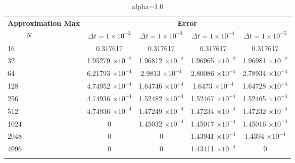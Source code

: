 	\begin{table}
		\begin{tabular}{lcccc}
			\toprule
			\multicolumn{1}{c}{\textbf{Approximation Max}} & \multicolumn{4}{c}{\textbf{Error}} \\
			$\hspace{9mm}N$ & $\Delta t=1\times 10^{-2}$ & $\Delta t=1\times 10^{-3}$ & $\Delta t=1\times 10^{-4}$ & $\Delta t=1\times 10^{-5}$ \\
			\midrule
			\hspace{7mm} 16 & 0.317617    & 0.317617    & 0.317617    & 0.317617    \\
			\midrule
			\hspace{7mm} 32 & 1.95279 $\times 10 ^{-2}$  & 1.96812 $\times 10 ^{-2}$   & 1.96965 $\times 10 ^{-2}$   & 1.96981 $\times 10 ^{-2}$   \\
			\midrule
			\hspace{7mm} 64 & 6.21793 $\times 10 ^{-4}$ & 2.9813 $\times 10 ^{-4}$  & 2.80086 $\times 10 ^{-4}$ & 2.78934 $\times 10 ^{-4}$ \\
			\midrule
			\hspace{7mm} 128 & 4.74952 $\times 10 ^{-4}$ & 1.64746 $\times 10 ^{-4}$ & 1.6473 $\times 10 ^{-4}$  & 1.64728 $\times 10 ^{-4}$ \\
			\midrule
			\hspace{7mm} 256 & 4.74936 $\times 10 ^{-4}$ & 1.52482 $\times 10 ^{-4}$ & 1.52467 $\times 10 ^{-4}$ & 1.52465 $\times 10 ^{-4}$ \\
			\midrule
			\hspace{7mm} 512 & 4.74936 $\times 10 ^{-4}$ & 1.47249 $\times 10 ^{-4}$ & 1.47234 $\times 10 ^{-4}$ & 1.47232 $\times 10 ^{-4}$ \\
			\midrule
			\hspace{7mm} 1024 & 0           & 1.45032 $\times 10 ^{-4}$ & 1.45017 $\times 10 ^{-4}$ & 1.45016 $\times 10 ^{-4}$ \\
			\midrule
			\hspace{7mm} 2048 & 0           & 0           & 1.43941 $\times 10 ^{-4}$ & 1.4394 $\times 10 ^{-4}$ \\
			\midrule
			\hspace{7mm} 4096 & 0           & 0           & 1.43411 $\times 10 ^{-4}$ & 0           \\
			\\
			\bottomrule
		\end{tabular}
		\caption{alpha=1.0}
	\end{table}
	
